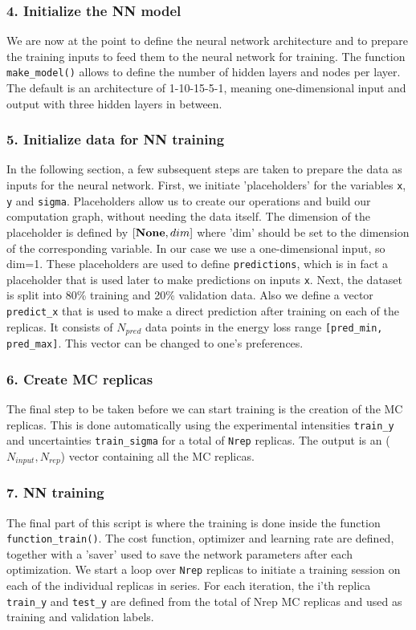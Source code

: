 \subsubsection*{4. Initialize the NN model}

We are now at the point to define the neural network architecture and to prepare the
training inputs to feed them to the neural network for training. 
%
The function {\tt make\_model()} allows to define the number of hidden layers and 
nodes per layer. The default is an architecture of 1-10-15-5-1, meaning one-dimensional 
input and output with three hidden layers in between.

\subsubsection*{5. Initialize data for NN training}

In the following section, a few subsequent steps are taken to prepare the data
as inputs for the neural network. 
%
First, we initiate 'placeholders' for the variables
{\tt x}, {\tt y} and {\tt sigma}. Placeholders allow us to create our operations and 
build our computation graph, without needing the data itself. 
%
The dimension of the placeholder is defined by {\tt $[{\bf None}, dim]$} where 'dim'
should be set to the dimension of the corresponding variable. In our case we use a 
one-dimensional input, so dim=1. 
%
These placeholders are used to define {\tt predictions}, which is in fact a placeholder that is used 
later to make predictions on inputs {\tt x}. 
%
Next, the dataset is split into 80\% training and
20\% validation data.
%
Also we define a vector {\tt predict\_x} that is used to make a direct prediction after training
on each of the replicas. It consists of $N_{pred}$ data points in the energy loss range
{\tt [pred\_min, pred\_max]}. This vector can be changed to one's preferences. 
%

\subsubsection*{6. Create MC replicas}
The final step to be taken before we can start training is the creation of the MC replicas.
%
This is done automatically using the experimental intensities {\tt train\_y} and uncertainties
{\tt train\_sigma} for a total of {\tt Nrep} replicas. The output is an ($N_{input}, N_{rep}$) 
vector containing all the MC replicas. 

\subsubsection*{7. NN training}
The final part of this script is where the training is done inside the function {\tt function\_train()}. 
%
The cost function, optimizer and learning rate are defined, together with a 'saver' used to 
save the network parameters after each optimization. 
%
We start a loop over {\tt Nrep} replicas to initiate a training session on each of the individual replicas
in series. 
%
For each iteration, the i'th replica {\tt train\_y} and {\tt test\_y} are defined from the total of Nrep 
MC replicas and used as training and validation labels. 
\\


